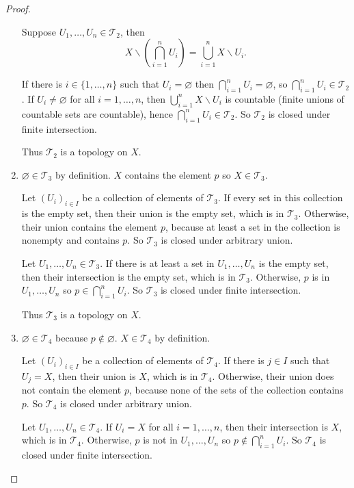 \begin{proof}
\begin{enumerate}[label={(\alph*)}]
		      Suppose $U_{1}, \ldots, U_{n}\in\mathscr{T}_{2}$, then
		      \[
			      X\smallsetminus \left(\bigcap^{n}_{i=1}U_{i}\right) = \bigcup^{n}_{i=1}X\smallsetminus U_{i}.
		      \]

		      If there is $i \in \{1,\ldots,n\}$ such that $U_{i} = \varnothing$ then $\bigcap^{n}_{i=1}U_{i} = \varnothing$, so $\bigcap^{n}_{i=1}U_{i}\in\mathscr{T}_{2}$.  If $U_{i}\ne\varnothing$ for all $i=1,\ldots,n$, then $\bigcup^{n}_{i=1}X\smallsetminus U_{i}$ is countable (finite unions of countable sets are countable), hence $\bigcap^{n}_{i=1}U_{i}\in\mathscr{T}_{2}$. So $\mathscr{T}_{2}$ is closed under finite intersection.

		      Thus $\mathscr{T}_{2}$ is a topology on $X$.
		\item $\varnothing\in\mathscr{T}_{3}$ by definition. $X$ contains the element $p$ so $X\in\mathscr{T}_{3}$.

		      Let ${(U_{i})}_{i\in I}$ be a collection of elements of $\mathscr{T}_{3}$. If every set in this collection is the empty set, then their union is the empty set, which is in $\mathscr{T}_{3}$. Otherwise, their union contains the element $p$, because at least a set in the collection is nonempty and contains $p$. So $\mathscr{T}_{3}$ is closed under arbitrary union.

		      Let $U_{1}, \ldots, U_{n}\in\mathscr{T}_{3}$. If there is at least a set in $U_{1}, \ldots, U_{n}$ is the empty set, then their intersection is the empty set, which is in $\mathscr{T}_{3}$. Otherwise, $p$ is in $U_{1}, \ldots, U_{n}$ so $p\in \bigcap^{n}_{i=1}U_{i}$. So $\mathscr{T}_{3}$ is closed under finite intersection.

		      Thus $\mathscr{T}_{3}$ is a topology on $X$.
		\item $\varnothing\in\mathscr{T}_{4}$ because $p\notin \varnothing$. $X\in\mathscr{T}_{4}$ by definition.

		      Let ${(U_{i})}_{i\in I}$ be a collection of elements of $\mathscr{T}_{4}$. If there is $j\in I$ such that $U_{j} = X$, then their union is $X$, which is in $\mathscr{T}_{4}$. Otherwise, their union does not contain the element $p$, because none of the sets of the collection contains $p$. So $\mathscr{T}_{4}$ is closed under arbitrary union.

		      Let $U_{1}, \ldots, U_{n}\in\mathscr{T}_{4}$. If $U_{i} = X$ for all $i = 1,\ldots, n$, then their intersection is $X$, which is in $\mathscr{T}_{4}$. Otherwise, $p$ is not in $U_{1}, \ldots, U_{n}$ so $p\notin \bigcap^{n}_{i=1}U_{i}$. So $\mathscr{T}_{4}$ is closed under finite intersection.


\end{enumerate}
\end{proof}
